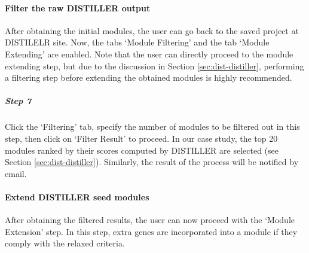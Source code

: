 \paragraph{Filter the raw DISTILLER output} After obtaining the initial modules, 
the user can go back to the saved project at DISTILELR site.  Now, the tabs
`Module Filtering' and the tab `Module Extending' are enabled.  Note that the
user can directly proceed to the module extending step, but due to the
discussion in Section \ref{sec:dist-distiller}, performing a filtering step
before extending the obtained modules is highly recommended.

\begin{small} %
\subparagraph{Step 7} Click the `Filtering' tab, specify the number of 
modules to be filtered out in this step, then click on `Filter Result' to
proceed.  In our case study, the top 20 modules ranked by their scores
computed by DISTILLER are selected (see Section
\ref{sec:dist-distiller}). Similarly, the result of the process will be
notified by email.
\end{small}

\paragraph{Extend DISTILLER seed modules} After obtaining the filtered results, 
the user can now proceed with the `Module Extension' step.
%
In this step, extra genes are incorporated into a module if they comply with
the relaxed criteria.

